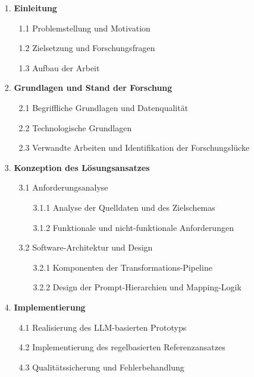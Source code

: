 \begin{itemize}
    \item[1.] \textbf{Einleitung}
    \begin{itemize}
        \item[1.1] Problemstellung und Motivation
        \item[1.2] Zielsetzung und Forschungsfragen
        \item[1.3] Aufbau der Arbeit
    \end{itemize}
    
    \item[2.] \textbf{Grundlagen und Stand der Forschung}
    \begin{itemize}
        \item[2.1] Begriffliche Grundlagen und Datenqualität
        \item[2.2] Technologische Grundlagen
        \item[2.3] Verwandte Arbeiten und Identifikation der Forschungslücke
    \end{itemize}
    
    \item[3.] \textbf{Konzeption des Lösungsansatzes}
    \begin{itemize}
        \item[3.1] Anforderungsanalyse
        \begin{itemize}
            \item[3.1.1] Analyse der Quelldaten und des Zielschemas
            \item[3.1.2] Funktionale und nicht-funktionale Anforderungen
        \end{itemize}
        \item[3.2] Software-Architektur und Design
        \begin{itemize}
            \item[3.2.1] Komponenten der Transformations-Pipeline
            \item[3.2.2] Design der Prompt-Hierarchien und Mapping-Logik
        \end{itemize}
    \end{itemize}
    
    \item[4.] \textbf{Implementierung}
    \begin{itemize}
        \item[4.1] Realisierung des LLM-basierten Prototyps
        \item[4.2] Implementierung des regelbasierten Referenzansatzes
        \item[4.3] Qualitätssicherung und Fehlerbehandlung
    \end{itemize}
    

\end{itemize}

